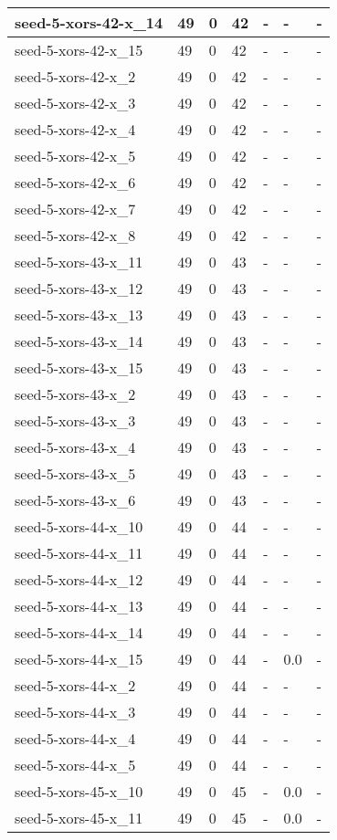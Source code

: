 \begin{scriptsize}
\begin{longtable}{|p{5cm}|l|l|l|l|l|l|}
seed-5-xors-42-x\_14&49&0&42&-&-&- \\ \hline 
seed-5-xors-42-x\_15&49&0&42&-&-&- \\ \hline 
seed-5-xors-42-x\_2&49&0&42&-&-&- \\ \hline 
seed-5-xors-42-x\_3&49&0&42&-&-&- \\ \hline 
seed-5-xors-42-x\_4&49&0&42&-&-&- \\ \hline 
seed-5-xors-42-x\_5&49&0&42&-&-&- \\ \hline 
seed-5-xors-42-x\_6&49&0&42&-&-&- \\ \hline 
seed-5-xors-42-x\_7&49&0&42&-&-&- \\ \hline 
seed-5-xors-42-x\_8&49&0&42&-&-&- \\ \hline 
seed-5-xors-43-x\_11&49&0&43&-&-&- \\ \hline 
seed-5-xors-43-x\_12&49&0&43&-&-&- \\ \hline 
seed-5-xors-43-x\_13&49&0&43&-&-&- \\ \hline 
seed-5-xors-43-x\_14&49&0&43&-&-&- \\ \hline 
seed-5-xors-43-x\_15&49&0&43&-&-&- \\ \hline 
seed-5-xors-43-x\_2&49&0&43&-&-&- \\ \hline 
seed-5-xors-43-x\_3&49&0&43&-&-&- \\ \hline 
seed-5-xors-43-x\_4&49&0&43&-&-&- \\ \hline 
seed-5-xors-43-x\_5&49&0&43&-&-&- \\ \hline 
seed-5-xors-43-x\_6&49&0&43&-&-&- \\ \hline 
seed-5-xors-44-x\_10&49&0&44&-&-&- \\ \hline 
seed-5-xors-44-x\_11&49&0&44&-&-&- \\ \hline 
seed-5-xors-44-x\_12&49&0&44&-&-&- \\ \hline 
seed-5-xors-44-x\_13&49&0&44&-&-&- \\ \hline 
seed-5-xors-44-x\_14&49&0&44&-&-&- \\ \hline 
seed-5-xors-44-x\_15&49&0&44&-&0.0&- \\ \hline 
seed-5-xors-44-x\_2&49&0&44&-&-&- \\ \hline 
seed-5-xors-44-x\_3&49&0&44&-&-&- \\ \hline 
seed-5-xors-44-x\_4&49&0&44&-&-&- \\ \hline 
seed-5-xors-44-x\_5&49&0&44&-&-&- \\ \hline 
seed-5-xors-45-x\_10&49&0&45&-&0.0&- \\ \hline 
seed-5-xors-45-x\_11&49&0&45&-&0.0&- \\ \hline 

\end{longtable}
\end{scriptsize}
